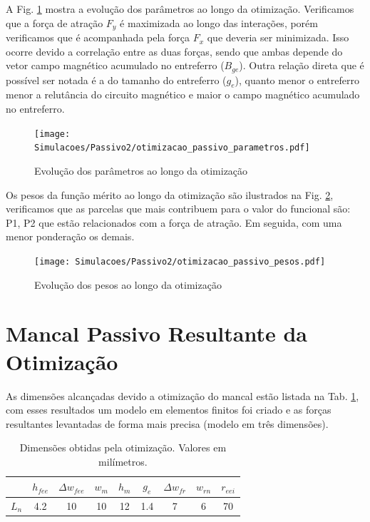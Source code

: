 A Fig. \ref{fig:otimizacao_passivo_parametros} mostra a evolução dos parâmetros ao longo da otimização. Verificamos que a força de atração $F_y$ é maximizada ao longo das interações, porém verificamos que é acompanhada pela força $F_x$ que deveria ser minimizada. Isso ocorre devido a correlação entre as duas forças, sendo que ambas depende do vetor campo magnético acumulado no entreferro ($B_{ge}$). Outra relação direta que é possível ser notada é a do tamanho do entreferro ($g_e$), quanto menor o entreferro menor a relutância do circuito magnético e maior o campo magnético acumulado no entreferro.


\begin{figure}[bh!]
	\centering
	\texttt{[image: Simulacoes/Passivo2/otimizacao\_passivo\_parametros.pdf]}
	\caption{Evolução dos parâmetros ao longo da otimização}
	\label{fig:otimizacao_passivo_parametros}
\end{figure} 

Os pesos da função mérito ao longo da otimização são ilustrados na Fig. \ref{fig:otimizacao_passivo_pesos}, verificamos que as parcelas que mais contribuem para o valor do funcional são: P1, P2 que estão relacionados com a força de atração. Em seguida, com uma menor ponderação os demais. 

\begin{figure}[th!]
	\centering
	\texttt{[image: Simulacoes/Passivo2/otimizacao\_passivo\_pesos.pdf]}
	\caption{Evolução dos pesos ao longo da otimização}
	\label{fig:otimizacao_passivo_pesos}
\end{figure} 

\section{Mancal Passivo Resultante da Otimização}

As dimensões alcançadas devido a otimização do mancal estão listada na Tab. \ref{tab:passivo:dimensoes:otimizado}, com esses resultados um modelo em elementos finitos foi criado e as forças resultantes levantadas de forma mais precisa (modelo em três dimensões).

\begin{table}[ht!]
	\centering
	\begin{tabular}{c c c c c c c c c}
		& $h_{fee}$ &$\Delta w_{fee}$ & $w_m$ & $h_m$  & $g_e$ & $\Delta w_{fr}$ & $w_{rn}$ & $r_{eei}$ \\ \hline \hline
		$L_{n}$  	&  4.2 &   10 &   10 &    12 &   1.4 &  7 &   6 &    70 \\
	\end{tabular} 
	\caption{Dimensões obtidas pela otimização. Valores em milímetros.}
	\label{tab:passivo:dimensoes:otimizado} 
\end{table}

